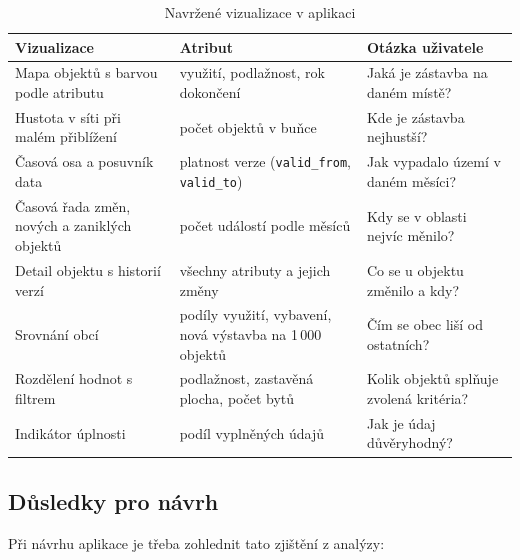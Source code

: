 \begin{table}[H]
\centering
\caption{Navržené vizualizace v aplikaci}
\label{tab:vizualizace}
\begin{tabular}{p{3.6cm}|p{3.4cm}|p{6.6cm}}
Vizualizace & Atribut & Otázka uživatele \tabularnewline \hline
Mapa objektů s barvou podle atributu & využití, podlažnost, rok dokončení & Jaká je zástavba na daném místě? \tabularnewline \hline
Hustota v síti při malém přiblížení & počet objektů v buňce & Kde je zástavba nejhustší? \tabularnewline \hline
Časová osa a posuvník data & platnost verze (\texttt{valid\_from}, \texttt{valid\_to}) & Jak vypadalo území v daném měsíci? \tabularnewline \hline
Časová řada změn, nových a zaniklých objektů & počet událostí podle měsíců & Kdy se v oblasti nejvíc měnilo? \tabularnewline \hline
Detail objektu s historií verzí & všechny atributy a jejich změny & Co se u objektu změnilo a kdy? \tabularnewline \hline
Srovnání obcí & podíly využití, vybavení, nová výstavba na 1\,000 objektů & Čím se obec liší od ostatních? \tabularnewline \hline
Rozdělení hodnot s filtrem & podlažnost, zastavěná plocha, počet bytů & Kolik objektů splňuje zvolená kritéria? \tabularnewline \hline
Indikátor úplnosti & podíl vyplněných údajů & Jak je údaj důvěryhodný? \tabularnewline
\end{tabular}
\end{table}

\subsection{Důsledky pro návrh}

Při návrhu aplikace je třeba zohlednit tato zjištění z analýzy:

